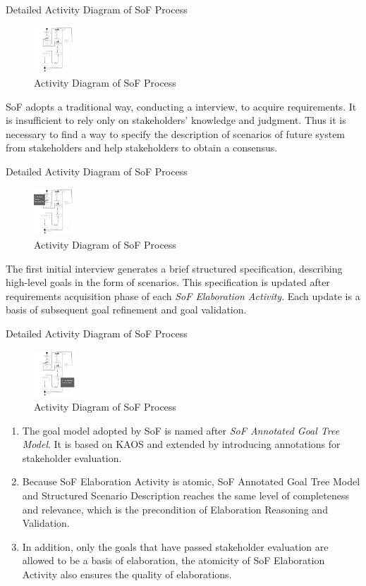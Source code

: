 \documentclass{beamer}
\begin{document}
\begin{frame}{Detailed Activity Diagram of SoF Process}
  \begin{figure}
    \includegraphics[width=0.6in]{img/2.PNG}
    \caption{Activity Diagram of SoF Process}
  \end{figure}
  SoF adopts a traditional way, conducting a interview, to acquire requirements. It is insufficient to rely only on stakeholders' knowledge and judgment. Thus it is necessary to find a way to specify the description of scenarios of future system from stakeholders and help stakeholders to obtain a consensus.
\end{frame}  

\begin{frame}{Detailed Activity Diagram of SoF Process}
  \begin{figure}
    \includegraphics[width=0.6in]{img/2_1.PNG}
    \caption{Activity Diagram of SoF Process}
  \end{figure}
  The first initial interview generates a brief structured specification, describing high-level goals in the form of scenarios. This specification is updated after requirements acquisition phase of each \emph{SoF Elaboration Activity}. Each update is a basis of subsequent goal refinement and goal validation.
\end{frame}  

\begin{frame}{Detailed Activity Diagram of SoF Process}
  \begin{figure}
    \includegraphics[width=0.6in]{img/2_2.PNG}
    \caption{Activity Diagram of SoF Process}
  \end{figure}
  \footnotesize{
\begin{enumerate}
\item The goal model adopted by SoF is named after \emph{SoF Annotated Goal Tree Model}. It is based on KAOS and extended by introducing annotations for stakeholder evaluation.
\item  Because SoF Elaboration Activity is atomic, SoF Annotated Goal Tree Model and Structured Scenario Description reaches the same level of completeness and relevance, which is the precondition of Elaboration Reasoning and Validation.
\item  In addition, only the goals that have passed stakeholder evaluation are allowed to be a basis of elaboration, the atomicity of SoF Elaboration Activity also ensures the quality of elaborations.
\end{enumerate}
}
\end{frame}
\end{document}
